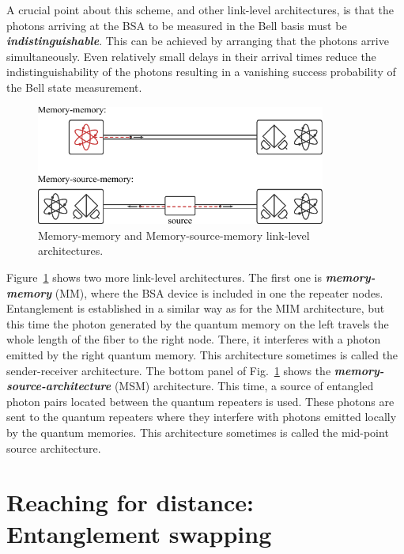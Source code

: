 A crucial point about this scheme, and other link-level architectures, is that the photons arriving at the BSA to be measured in the Bell basis must be \textit{\textbf{indistinguishable}}.
This can be achieved by arranging that the photons arrive simultaneously. 
Even relatively small delays in their arrival times reduce the indistinguishability of the photons resulting in a vanishing success probability of the Bell state measurement.

\begin{figure}[t]
    \centering
    \includegraphics[width=0.85\textwidth]{lesson12/12-2_MM_MSM.pdf}
    \caption[MM and MSM architectures]{Memory-memory and Memory-source-memory link-level architectures.}
    \label{fig:12-2_MM_MSM}
\end{figure}

Figure~\ref{fig:12-2_MM_MSM} shows two more link-level architectures.
The first one is \textit{\textbf{memory-memory}} (MM), where the BSA device is included in one the repeater nodes.
Entanglement is established in a similar way as for the MIM architecture, but this time the photon generated by the quantum memory on the left travels the whole length of the fiber to the right node.
There, it interferes with a photon emitted by the right quantum memory.
This architecture sometimes is called the sender-receiver architecture.
The bottom panel of Fig.~\ref{fig:12-2_MM_MSM} shows the \textit{\textbf{memory-source-architecture}} (MSM) architecture.
This time, a source of entangled photon pairs located between the quantum repeaters is used.
These photons are sent to the quantum repeaters where they interfere with photons emitted locally by the quantum memories. This architecture sometimes is called the mid-point source architecture.


\section{Reaching for distance: Entanglement swapping}
\label{sec:fig:12-3_reaching_for_distance}

